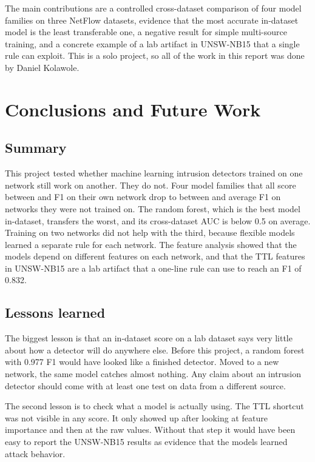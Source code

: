 \documentclass[10pt,twocolumn,letterpaper]{article}
\begin{document}
\INTRORESULTS

The main contributions are a controlled cross-dataset comparison of four model families on three NetFlow datasets, evidence that the most accurate in-dataset model is the least transferable one, a negative result for simple multi-source training, and a concrete example of a lab artifact in UNSW-NB15 that a single rule can exploit. This is a solo project, so all of the work in this report was done by Daniel Kolawole.




\section{Conclusions and Future Work}

\subsection{Summary}

This project tested whether machine learning intrusion detectors trained on one network still work on another. They do not. Four model families that all score between \INFMIN{} and \INFMAX{} F1 on their own network drop to between \CROSSMIN{} and \CROSSMAXAVG{} average F1 on networks they were not trained on. The random forest, which is the best model in-dataset, transfers the worst, and its cross-dataset AUC is below 0.5 on average. Training on two networks did not help with the third, because flexible models learned a separate rule for each network. The feature analysis showed that the models depend on different features on each network, and that the TTL features in UNSW-NB15 are a lab artifact that a one-line rule can use to reach an F1 of 0.832. \CONCLABLATION

\subsection{Lessons learned}

The biggest lesson is that an in-dataset score on a lab dataset says very little about how a detector will do anywhere else. Before this project, a random forest with 0.977 F1 would have looked like a finished detector. Moved to a new network, the same model catches almost nothing. Any claim about an intrusion detector should come with at least one test on data from a different source.

The second lesson is to check what a model is actually using. The TTL shortcut was not visible in any score. It only showed up after looking at feature importance and then at the raw values. Without that step it would have been easy to report the UNSW-NB15 results as evidence that the models learned attack behavior.
\end{document}
